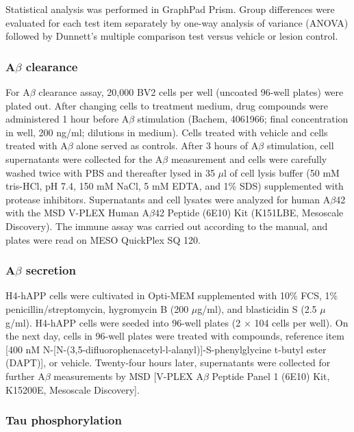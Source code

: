 \documentclass[letterpaper]{article}
\begin{document}
Statistical analysis was performed in GraphPad Prism. Group differences
were evaluated for each test item separately by one-way analysis of variance
(ANOVA) followed by Dunnett's multiple comparison test versus vehicle or
lesion control.

\subsubsection{A$\beta$ clearance}

For A$\beta$ clearance assay, 20,000 BV2 cells per well (uncoated 96-well
plates) were plated out. After changing cells to treatment medium, drug
compounds were administered 1 hour before A$\beta$ stimulation (Bachem,
4061966; final concentration in well, 200 ng/ml; dilutions in medium). Cells
treated with vehicle and cells treated with A$\beta$ alone served as controls.
After 3 hours of A$\beta$ stimulation, cell supernatants were collected for
the A$\beta$ measurement and cells were carefully washed twice with PBS and
thereafter lysed in 35 $\mu$l of cell lysis buffer (50 mM tris-HCl, pH 7.4,
150 mM NaCl, 5 mM EDTA, and 1\% SDS) supplemented with protease inhibitors.
Supernatants and cell lysates were analyzed for human A$\beta$42 with the MSD
V-PLEX Human A$\beta$42 Peptide (6E10) Kit (K151LBE, Mesoscale Discovery). The
immune assay was carried out according to the manual, and plates were read on
MESO QuickPlex SQ 120.

\subsubsection{A$\beta$ secretion}

H4-hAPP cells were cultivated in Opti-MEM supplemented with 10\% FCS, 1\%
penicillin/streptomycin, hygromycin B (200 $\mu$g/ml), and blasticidin S (2.5
$\mu$g/ml).  H4-hAPP cells were seeded into 96-well plates (2 $\times$ 104
cells per well). On the next day, cells in 96-well plates were treated with
compounds, reference item [400 nM
N-[N-(3,5-difluorophenacetyl-l-alanyl)]-S-phenylglycine t-butyl ester (DAPT)],
or vehicle. Twenty-four hours later, supernatants were collected for further
A$\beta$ measurements by MSD [V-PLEX A$\beta$ Peptide Panel 1 (6E10) Kit,
K15200E, Mesoscale Discovery].

\subsubsection{Tau phosphorylation}
\end{document}
